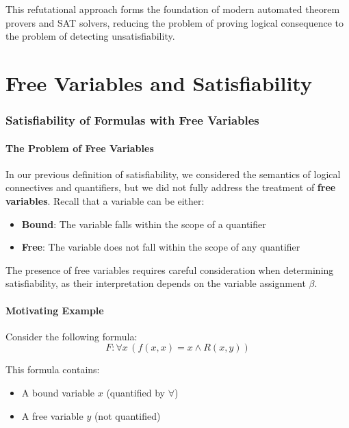 \documentclass[11pt,a4paper]{article}
\theoremstyle{definition}
\theoremstyle{plain}
\theoremstyle{remark}
\begin{document}
This refutational approach forms the foundation of modern automated theorem provers and SAT solvers, reducing the problem of proving logical consequence to the problem of detecting unsatisfiability.




\newpage

\part{Free Variables and Satisfiability}

\section{Satisfiability of Formulas with Free Variables}

\subsection{The Problem of Free Variables}

In our previous definition of satisfiability, we considered the semantics of logical connectives and quantifiers, but we did not fully address the treatment of \textbf{free variables}. Recall that a variable can be either:
\begin{itemize}
    \item \textbf{Bound}: The variable falls within the scope of a quantifier
    \item \textbf{Free}: The variable does not fall within the scope of any quantifier
\end{itemize}

The presence of free variables requires careful consideration when determining satisfiability, as their interpretation depends on the variable assignment $\beta$.

\subsection{Motivating Example}

Consider the following formula:
\[
F: \forall x \, (f(x, x) = x \wedge R(x, y))
\]

This formula contains:
\begin{itemize}
    \item A bound variable $x$ (quantified by $\forall$)
    \item A free variable $y$ (not quantified)
\end{itemize}
\end{document}
